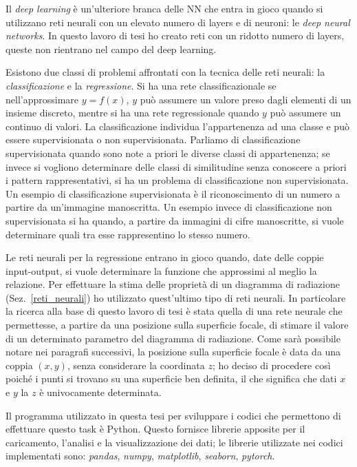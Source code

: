 \documentclass[12pt,a4paper,final]{book}
\begin{document}
Il \textit{deep learning} è un'ulteriore branca delle NN che entra in gioco quando si utilizzano reti neurali con un elevato numero di layers e di neuroni: le \textit{deep neural networks}. In questo lavoro di tesi ho creato reti con un ridotto numero di layers, queste non rientrano nel campo del deep learning.


Esistono due classi di problemi affrontati con la tecnica delle reti neurali: la \textit{classificazione} e la \textit{regressione}.
Si ha una rete classificazionale se nell'approssimare $y=f(x)$, $y$ può assumere un valore preso dagli elementi di un insieme discreto, mentre si ha una rete regressionale quando $y$ può assumere un continuo di valori.
La classificazione individua l'appartenenza ad una classe e può essere supervisionata o non supervisionata. Parliamo di classificazione supervisionata quando sono note a priori le diverse classi di appartenenza; se invece si vogliono determinare delle classi di similitudine senza conoscere a priori i pattern rappresentativi, si ha un problema di classificazione non supervisionata.
Un esempio di classificazione supervisionata è il riconoscimento di un numero a partire da un'immagine manoscritta. Un esempio invece di classificazione non supervisionata si ha quando, a partire da immagini di cifre manoscritte, si vuole determinare quali tra esse rappresentino lo stesso numero.


Le reti neurali per la regressione entrano in gioco quando, date delle coppie input-output, si vuole determinare la funzione che approssimi al meglio la relazione. Per effettuare la stima delle proprietà di un diagramma di radiazione (Sez.~\ref{reti_neurali}) ho utilizzato quest'ultimo tipo di reti neurali. In particolare la ricerca alla base di questo lavoro di tesi è stata quella di una rete neurale che permettesse, a partire da una posizione sulla superficie focale, di stimare il valore di un determinato parametro del diagramma di radiazione. Come sarà possibile notare nei paragrafi successivi, la posizione sulla superficie focale è data da una coppia $(x, y)$, senza considerare la coordinata $z$; ho deciso di procedere così poiché i punti si trovano su una superficie ben definita, il che significa che dati $x$ e $y$ la $z$ è univocamente determinata.


Il programma utilizzato in questa tesi per sviluppare i codici che permettono di effettuare questo task è Python. Questo fornisce librerie apposite per il caricamento, l'analisi e la visualizzazione dei dati; le librerie utilizzate nei codici implementati sono: \textit{pandas}, \textit{numpy}, \textit{matplotlib}, \textit{seaborn}, \textit{pytorch}.
\end{document}
